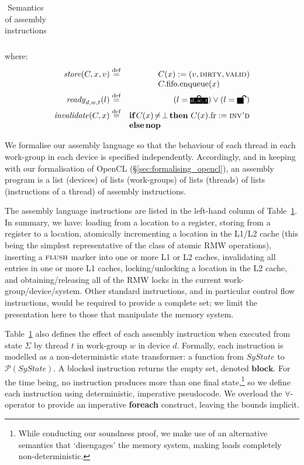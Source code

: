 \documentclass[svgnames,10pt]{sigplanconf}
\makeatletter
\theoremstyle{definition}
\newcommand\stack[2][l]{{\renewcommand\arraystretch{1}\begin{array}[t]{@{}#1@{}}#2\end{array}}}
\newcommand\padlock[1]{\begin{tikzpicture}[baseline=(n.base), yscale=-1]
\node[draw=black, fill=black, text=white, inner sep=0.1ex, minimum width=1.5ex] (n) at (0,0) {\scriptsize\vphantom{d,}$#1$};
\draw [line width=0.2ex] ([xshift=-0.55ex]n.north) arc (-180:0:0.55ex);
\end{tikzpicture}}
\newcommand\unpadlock{\begin{tikzpicture}[baseline=(n.base), yscale=-1]
\node[draw=black, fill=black, text=white, inner sep=0.1ex] (n) at (0,0) {\scriptsize \phantom{d,}};
\draw [line width=0.2ex] ([xshift=0.55ex]n.north) arc (-180:0:0.55ex);
\end{tikzpicture}}
\newcommand\var[1]{\mathit{#1}}
\newcommand\eqdef{\overset{{\tiny\rm def}}{=}}
\newcommand\IF{\textbf{if}}
\newcommand\THEN{\textbf{then}}
\newcommand\ELSE{\textbf{else}}
\newcommand\BLOCK{\textbf{block}}
\newcommand\NOP{\textbf{nop}}
\newcommand\DIRTY{\textsc{dirty}}
\newcommand\VALID{\textsc{valid}}
\newcommand\INVALID{\textsc{inv'd}}
\makeatother
\begin{document}
\begin{table}
\begin{tabular}{ll}
\\
\hline
\end{tabular}
\par\vspace*{1mm}
\raggedright where:
\begin{eqnarray*}
\var{store}(C,x,v) &\eqdef& \stack{C(x) := (v,\DIRTY,\VALID)
\\ C.\mathrm{fifo}.\mathrm{enqueue}(x)} 
\\
\var{ready}_{d,w,t}(l) &\eqdef& (l = \padlock{d,w,t}) \vee (l =
\unpadlock)
\\
\var{invalidate}(C,x) &\eqdef& \stack{\IF\,C(x)\!\neq\!\bot\,\THEN~C(x).\mathrm{fr} :=
\INVALID{}\\{}\ELSE\,\NOP}
\end{eqnarray*}
\vspace*{-3mm}
\caption{Semantics of assembly instructions}
\label{tab:assembly_semantics}
\end{table}

We formalise our assembly language so that the behaviour of each 
thread in each work-group in each device is specified independently.
Accordingly, and in keeping with our formalisation of OpenCL
(\S\ref{sec:formalising_opencl}), an assembly program is a list (devices) of
lists (work-groups) of lists (threads) of lists (instructions of a thread) of assembly instructions.

The assembly language instructions are listed in the left-hand column
of Table~\ref{tab:assembly_semantics}. In summary, we have: loading
from a location to a register, storing from a register to a location,
atomically incrementing a location in the L1/L2 cache (this being the
simplest representative of the class of atomic RMW operations), inserting a $\textsc{flush}$ marker into one or more L1
or L2 caches, invalidating all entries in one or more L1 caches,
locking/unlocking a location in the L2 cache, and obtaining/releasing
all of the RMW locks in the current work-group/device/system. Other
standard instructions, and in particular control flow
instructions, would be required to provide a complete set; we limit
the presentation here to those that manipulate the memory system.

Table~\ref{tab:assembly_semantics} also defines the effect of each
assembly instruction when executed from state $\Sigma$ by thread $t$
in work-group $w$ in device $d$. Formally, each instruction is
modelled as a non-deterministic state transformer: a function from
$\var{SyState}$ to $\mathcal P(\var{SyState})$. A blocked instruction
returns the empty set, denoted $\BLOCK$. For the time being, no
instruction produces more than one final state,\footnote{While
conducting our soundness proof, we make use of an alternative
semantics that `disengages' the memory system, making loads completely
non-deterministic.} so we define each instruction using deterministic,
imperative pseudocode. We overload the $\forall$-operator to provide
an imperative \textbf{foreach} construct, leaving the bounds implicit.
\end{document}
